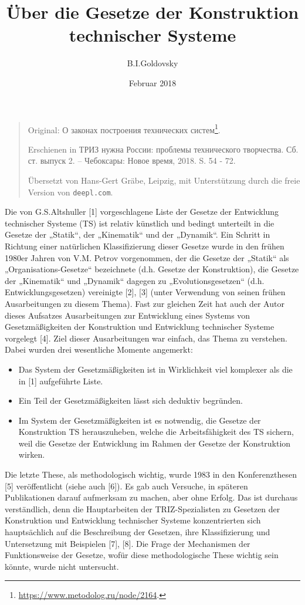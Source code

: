 \documentclass[11pt,a4paper]{article}
\title{Über die Gesetze der Konstruktion technischer Systeme }
\author{B.I.Goldovsky}
\date{Februar 2018}
\begin{document}
\maketitle
\begin{quote}
  Original: \foreignlanguage{russian}{О законах построения технических
    систем}\footnote{\url{https://www.metodolog.ru/node/2164}.}.

  Erschienen in \foreignlanguage{russian}{ТРИЗ нужна России: проблемы
    технического творчества. Сб. ст. выпуск 2. – Чебоксары: Новое время, 2018.}
  S. 54 - 72.
  
  Übersetzt von Hans-Gert Gräbe, Leipzig, mit Unterstützung durch die freie
  Version von \texttt{deepl.com}.
\end{quote}

Die von G.S.Altshuller [1] vorgeschlagene Liste der Gesetze der Entwicklung
technischer Systeme (TS) ist relativ künstlich und bedingt unterteilt in die
Gesetze der „Statik“, der „Kinematik“ und der „Dynamik“. Ein Schritt in
Richtung einer natürlichen Klassifizierung dieser Gesetze wurde in den frühen
1980er Jahren von V.M. Petrov vorgenommen, der die Gesetze der „Statik“ als
„Organisations-Gesetze“ bezeichnete (d.h. Gesetze der Konstruktion), die
Gesetze der „Kinematik“ und „Dynamik“ dagegen zu „Evolutionsgesetzen“
(d.h. Entwicklungsgesetzen) vereinigte [2], [3] (unter Verwendung von seinen
frühen Ausarbeitungen zu diesem Thema). Fast zur gleichen Zeit hat auch der
Autor dieses Aufsatzes Ausarbeitungen zur Entwicklung eines Systems von
Gesetzmäßigkeiten der Konstruktion und Entwicklung technischer Systeme
vorgelegt [4]. Ziel dieser Ausarbeitungen war einfach, das Thema zu verstehen.
Dabei wurden drei wesentliche Momente angemerkt:
\begin{itemize}
\item Das System der Gesetzmäßigkeiten ist in Wirklichkeit viel komplexer als
  die in [1] aufgeführte Liste.
\item Ein Teil der Gesetzmäßigkeiten lässt sich deduktiv begründen.
\item Im System der Gesetzmäßigkeiten ist es notwendig, die Gesetze der
  Konstruktion TS herauszuheben, welche die Arbeitsfähigkeit des TS sichern,
  weil die Gesetze der Entwicklung im Rahmen der Gesetze der Konstruktion
  wirken.
\end{itemize}

Die letzte These, als methodologisch wichtig, wurde 1983 in den
Konferenzthesen [5] veröffent\-licht (siehe auch [6]). Es gab auch Versuche,
in späteren Publikationen darauf aufmerksam zu machen, aber ohne Erfolg. Das
ist durchaus verständlich, denn die Hauptarbeiten der TRIZ-Spezialisten zu
Gesetzen der Konstruktion und Entwicklung technischer Systeme konzentrierten
sich hauptsächlich auf die Beschreibung der Gesetzen, ihre Klassifizierung und
Untersetzung mit Beispielen [7], [8]. Die Frage der Mechanismen der
Funktionsweise der Gesetze, wofür diese methodologische These wichtig sein
könnte, wurde nicht untersucht.
\end{document}
